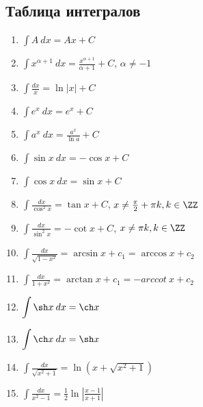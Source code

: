 \newpage

\subsection{Таблица интегралов}

\begin{enumerate}
    \item
        \(
            \displaystyle
            \int A \: dx = Ax + C 
        \)
    \item
        \( 
            \displaystyle
            \int x^{\alpha + 1} \: dx = \frac{x^{\alpha + 1}}{\alpha + 1} + C 
        \), \( \alpha \neq -1 \)
    \item
        \(
            \displaystyle
            \int \frac{dx}{x} = \ln |x| + C 
        \)
    \item
        \(
            \displaystyle
            \int e^x \: dx = e^x + C 
        \)
    \item
        \(
            \displaystyle
            \int a^x \: dx = \frac{a^x}{\ln a} + C 
        \)
    \item
        \(
            \displaystyle
            \int \sin x \: dx = -\cos x + C 
        \)
    \item
        \(
            \displaystyle
            \int \cos x \: dx = \sin x + C 
        \)
    \item
        \(
            \displaystyle
            \int \frac{dx}{\cos^2 x}= \tan x + C 
        \), \( x \neq \frac{\pi}{2} + \pi k, k \in \ZZ \) 
    \item
        \(
            \displaystyle
            \int \frac{dx}{\sin^2 x} = - \cot x + C 
        \), \( x \neq \pi k, k \in \ZZ \)
    \item
        \(
            \displaystyle
            \int \frac{dx}{\sqrt{1 - x^2}} = \arcsin x + c_1 = \arccos x + c_2 
        \)
    \item
        \(
            \displaystyle
            \int \frac{dx}{1 + x^2} = \arctan x + c_1 = -arccot \: x + c_2 
        \)
    \item
        \(
            \displaystyle
            \int \sh x \: dx = \ch x
        \)
    \item
        \(
            \displaystyle
            \int \ch x \: dx = \sh x
        \)
    \item
        \(
            \displaystyle
            \int \frac{dx}{\sqrt{x^2 + 1}} = \ln (x + \sqrt{x^2 + 1})
        \)
    \item
        \(
            \displaystyle
            \int \frac{dx}{x^2 - 1} = \frac{1}{2} \ln \left| \frac{x - 1}{x + 1} \right|
        \)
\end{enumerate}

